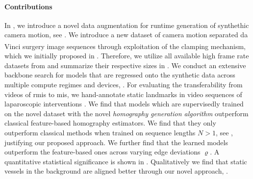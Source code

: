 \paragraph{Contributions} In , we introduce a novel data augmentation  for runtime generation of synthethic camera motion, see . We introduce a new dataset of camera motion separated da Vinci\textsuperscript{\textregistered} surgery image sequences through exploitation of the clamping mechanism, which we initially proposed in . Therefore, we utilize all available high frame rate datasets from  and summarize their respective sizes in . We conduct an extensive backbone search for models that are regressed onto the synthetic data across multiple compute regimes and devices, . For evaluating the transferability from videos of \gls{rmis} to \gls{mis}, we hand-annotate static landmarks in video sequences of laparoscopic interventions . We find that models which are supervisedly trained on the novel dataset with the novel \textit{homography generation algorithm} outperform classical feature-based homography estimators. We find that they only outperform classical methods when trained on sequence lengths $N>1$, see , justifying our proposed approach. We further find that the learned models outperform the feature-based ones across varying edge deviations $\varrho$. A quantitative statistical significance is shown in . Qualitatively we find that static vessels in the background are aligned better through our novel approach, .

